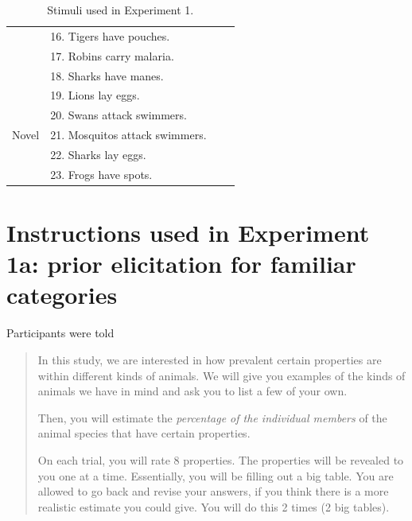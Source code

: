 \documentclass[10pt,letterpaper]{article}
\begin{document}
\begin{table}[h]
\begin{tabular}{| l || l | l | l |}
                                              & 16.  Tigers have pouches.                       &                &                     \\
                                              & 17.  Robins carry malaria.                       &                &                     \\
                                              & 18. Sharks have manes.                       &                &                     \\
                                              & 19. Lions lay eggs.                       &                &                     \\
                                              & 20. Swans attack swimmers.                       &                &                     \\
Novel                         & 21. Mosquitos attack swimmers.       &                &                    \\
                         & 22. Sharks lay eggs.       &                &                    \\
                         & 23. Frogs have spots.       &                &                   \\
\hline

\end{tabular}
\caption{Stimuli used in Experiment 1.}
\label{tab:expt1}
\end{table}


\section{Instructions used in Experiment 1a: prior elicitation for familiar categories}
\label{sec:prior1instruct}

Participants were told 
\begin{quote}
In this study, we are interested in how prevalent certain properties are within different kinds of animals. We will give you examples of the kinds of animals we have in mind and ask you to list a few of your own.

Then, you will estimate the \emph{percentage of the individual members} of the animal species that have certain properties.

On each trial, you will rate 8 properties. The properties will be revealed to you one at a time. Essentially, you will be filling out a big table. You are allowed to go back and revise your answers, if you think there is a more realistic estimate you could give. You will do this 2 times (2 big tables). 

\end{quote}
\end{document}
